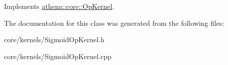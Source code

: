 Implements \mbox{\hyperlink{classathena_1_1core_1_1_op_kernel_a926afa57c90b4a999419cbbdc0496c65}{athena\+::core\+::\+Op\+Kernel}}.



The documentation for this class was generated from the following files\+:\begin{DoxyCompactItemize}
\item 
core/kernels/Sigmoid\+Op\+Kernel.\+h\item 
core/kernels/Sigmoid\+Op\+Kernel.\+cpp\end{DoxyCompactItemize}
